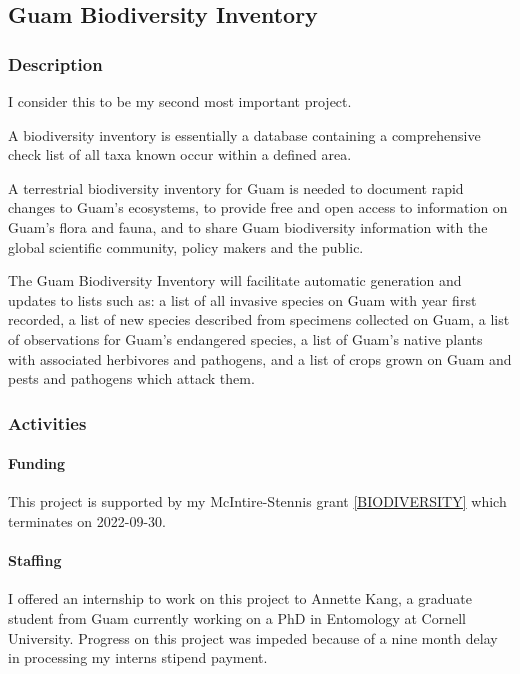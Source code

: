 \subsection{Guam Biodiversity Inventory}
\begin{refsection}
	
	\subsubsection{Description}
	
	I consider this to be my second most important project.
	
	A biodiversity inventory is essentially a database containing a comprehensive
	check list of all taxa known occur within a defined area.
	
	A terrestrial biodiversity inventory for Guam is needed to document
	rapid changes to Guam's ecosystems, to provide free
	and open access to information on Guam's flora and
	fauna, and to share Guam biodiversity information with the global
	scientific community, policy makers and the public.
	
	The Guam Biodiversity Inventory will facilitate automatic generation
	and updates to lists such as: a list of all invasive species on Guam
	with year first recorded, a list of new species described from specimens
	collected on Guam, a list of observations for Guam's
	endangered species, a list of Guam's native plants
	with associated herbivores and pathogens, and a list of crops grown
	on Guam and pests and pathogens which attack them.
	
	\subsubsection{Activities}
	
	\paragraph{Funding} This project is supported by my McIntire-Stennis grant \ref{BIODIVERSITY} which terminates on 2022-09-30.
	
	\paragraph{Staffing} I offered an internship to work on this project to Annette Kang, a graduate student from Guam currently working on a PhD in Entomology at Cornell University. Progress on this project was impeded because of a nine month delay in processing my interns stipend payment.  	
	

\end{refsection}
